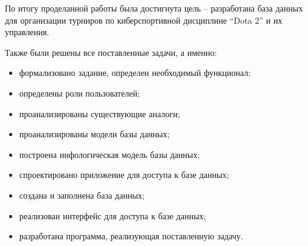 
По итогу проделанной работы была достигнута цель – разработана база данных для организации турниров по киберспортивной дисциплине “Dota 2” и их управления.

Также были решены все поставленные задачи, а именно:
\begin{itemize}
	\item формализовано задание, определен необходимый функционал;
	\item определены роли пользователей;
	\item проанализированы существующие аналоги;
	\item проанализированы модели базы данных;
	\item построена инфологическая модель базы данных;
	\item спроектировано приложение для доступа к базе данных;
	\item создана и заполнена база данных;
	\item реализован интерфейс для доступа к базе данных;
	\item разработана программа, реализующая поставленную задачу.
\end{itemize}